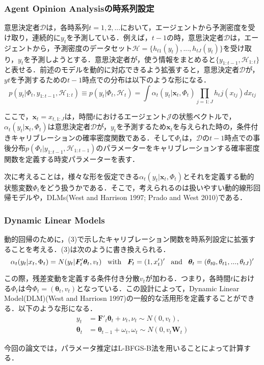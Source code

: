 \documentclass[11pt,a4paper]{article}
\begin{document}
\subsubsection{Agent Opinion Analysisの時系列設定}
意思決定者$\mathcal{D}$は，各時系列$t = 1,2,...$において，エージェントから予測密度を受け取り，連続的に$y_t$を予測している．例えば，$t-1$の時，意思決定者$\mathcal{D}$は，エージェントから，予測密度のデータセット$\mathcal{H} = \{h_{t1}(y_t),...,h_{tJ}(y_t)\}$を受け取り，$y_t$を予測しようとする．意思決定者が，使う情報をまとめると$\{y_{1:t-1},\mathcal{H}_{1:t}\}$と表せる．前述のモデルを動的に対応できるよう拡張すると，意思決定者$\mathcal{D}$が，$yt$を予測するための$t-1$時点での分布は以下のような形になる．
\begin{equation}
p(y_t|\Phi_t,y_{1:t-1},\mathcal{H}_{1:t}) \equiv p(y_t|\Phi_t,\mathcal{H}_t) = \int \alpha_t(y_t|{\bm x}_t,\Phi_t) \prod_{j=1:J} h_tj(x_{tj})dx_{tj}
\label{ons4}
\end{equation}\par
ここで，${\bm x}_t = x_{t,1:J}$は，時間$t$におけるエージェント$\mathcal{J}$の状態ベクトルで，$\alpha_t(y_t|{\bm x}_t,\Phi_t)$は意思決定者$\mathcal{D}$が，$y_t$を予測するため${\bm x}_t$を与えられた時の，条件付きキャリブレーションの確率密度関数である．そして$\Phi_t$は，$\mathcal{D}$の$t-1$時点での事後分布$p(\Phi_t|y_{1:t-1},\mathcal{H}_{1:t-1})$のパラメーターをキャリブレーションする確率密度関数を定義する時変パラメーターを表す．\par
次に考えることは，様々な形を仮定できる$\alpha_t(y_t|{\bm x}_t,\Phi_t)$とそれを定義する動的状態変数$\Phi_t$をどう扱うかである．そこで，考えられるのは扱いやすい動的線形回帰モデルや，DLMs(West and Harrison 1997; Prado and West 2010)である．
\subsubsection{Dynamic Linear Models}
動的回帰のために，(3)で示したキャリブレーション関数を時系列設定に拡張することを考える．(3)は次のように書き換えられる．
\begin{equation}
\alpha_t(y_t|x_t,\Phi_t) = N(y_t|{\bm F}'_t{\bm \theta}_t,v_t) \;\;\;{\rm with}\;\;\; {\bm F}_t = (1,x'_t)' \;\;\;{\rm and}\;\;\; {\bm \theta}_t = (\theta_{t0},\theta_{t1},...,\theta_{tJ})'
\label{ons5}
\end{equation}\par
この際，残差変動を定義する条件付き分散$v_t$が加わる．つまり，各時間$t$における$\Phi_t$は今$\Phi_t = ({\bm \theta}_t,v_t)$となっている．この設計によって，Dynamic Linear Model(DLM)(West and Harriosn 1997)の一般的な活用形を定義することができる．以下のような形になる．
\begin{equation}
\begin{split}
y_t &= {\bm F}'_t{\bm \theta}_t + \nu_t,   \nu_t \sim N(0,v_t),\\
{\bm \theta}_t &= {\bm \theta}_{t-1} +\omega_t, \omega_t \sim N(0,v_t{\bm W}_t)
\end{split}
\label{ons6}
\end{equation}\par
今回の論文では，パラメータ推定はL-BFGS-B法を用いることによって計算する．
\end{document}
